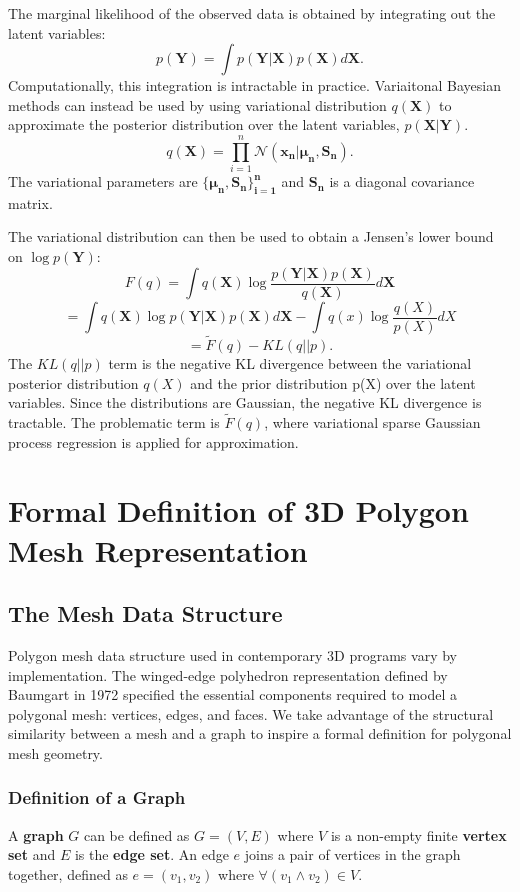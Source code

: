 \documentclass[ %
author={Dillon Keith Diep},
supervisor={Dr. Carl Henrik Ek},
degree={MEng},
title={ART-CG:},
subtitle={Assisted Real-time Content Generation of 3D Hair by Learning Manifolds},
type={Research},
year={2017} ]{dissertation}
\begin{document}
The marginal likelihood of the observed data is obtained by integrating out the latent variables:
$$p(\bm{Y})=\int p(\bm{Y|X})p(\bm{X})d\bm{X}.$$
Computationally, this integration is intractable in practice. Variaitonal Bayesian methods can instead be used by using variational distribution $q(\bm{X})$ to approximate the posterior distribution over the latent variables, $p(\bm{X|Y})$.
$$q(\bm{X})=\prod^n_{i=1}\mathcal{N}(\bm{x_n|\mu_n,S_n}).$$
The variational parameters are $\bm{ \{ \mu_n,S_n \}^n_{i=1} }$ and $\bm{S_n}$ is a diagonal covariance matrix. 

The variational distribution can then be used to obtain a Jensen's lower bound on $\log p(\bm{Y})$:
$$F(q)=\int q(\bm{X})\log \frac{ p(\bm{Y|X})p(\bm{X}) }{ q(\bm{X}) } d\bm{X}$$
$$=\int q(\bm{X})\log p(\bm{Y|X})p(\bm{X})d\bm{X} - \int q(x)\log\frac{q(X)}{p(X)}dX$$
$$=\tilde{F}(q)-KL(q||p).$$
The $KL(q||p)$ term is the negative KL divergence between the variational posterior distribution $q(X)$ and the prior distribution p(X) over the latent variables. Since the distributions are Gaussian, the negative KL divergence is tractable. The problematic term is $\tilde{F}(q)$, where variational sparse Gaussian process regression is applied for approximation.

\section{Formal Definition of 3D Polygon Mesh Representation}

\subsection{The Mesh Data Structure}
Polygon mesh data structure used in contemporary 3D programs vary by implementation. The winged-edge polyhedron representation defined by Baumgart in 1972 \cite{wingededge} specified the essential components required to model a polygonal mesh: vertices, edges, and faces. We take advantage of the structural similarity between a mesh and a graph to inspire a formal definition for polygonal mesh geometry.

\subsubsection{Definition of a Graph}
A \textbf{graph} $G$ can be defined as $G=(V,E)$ where $V$ is a non-empty finite \textbf{vertex set} and $E$ is the \textbf{edge set}\cite[p.8]{graphtheory}. An edge $e$ joins a pair of vertices in the graph together, defined as $e=(v_1, v_2)$ where $\forall(v_1 \land v_2)\in V$.
\end{document}
